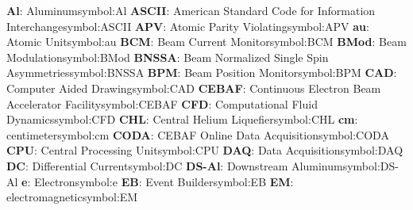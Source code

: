 \begin{tabbing}
\hspace{-0.27cm}
\addsymbol \textbf{Al}: {Aluminum}{symbol:Al}
\hspace{-0.27cm}
\addsymbol \textbf{ASCII}: {American Standard Code for Information Interchange}{symbol:ASCII}
\hspace{-0.27cm}
\addsymbol \textbf{APV}: {Atomic Parity Violating}{symbol:APV}
\hspace{-0.27cm}
\addsymbol \textbf{au}: {Atomic Unit}{symbol:au}
\hspace{-0.27cm}
\addsymbol \textbf{BCM}: {Beam Current Monitor}{symbol:BCM}
\hspace{-0.27cm}
\addsymbol \textbf{BMod}: {Beam Modulation}{symbol:BMod}
\hspace{-0.27cm}
\addsymbol \textbf{BNSSA}: {Beam Normalized Single Spin Asymmetries}{symbol:BNSSA}
\hspace{-0.27cm}
\addsymbol \textbf{BPM}: {Beam Position Monitor}{symbol:BPM}
\hspace{-0.27cm}
\addsymbol \textbf{CAD}: {Computer Aided Drawing}{symbol:CAD}
\hspace{-0.27cm}
\addsymbol \textbf{CEBAF}: {Continuous Electron Beam Accelerator Facility}{symbol:CEBAF}
\hspace{-0.27cm}
\addsymbol \textbf{CFD}: {Computational Fluid Dynamics}{symbol:CFD}
\hspace{-0.27cm}
\addsymbol \textbf{CHL}: {Central Helium Liquefier}{symbol:CHL}
\hspace{-0.27cm}
\addsymbol \textbf{cm}: {centimeter}{symbol:cm}
\hspace{-0.27cm}
\addsymbol \textbf{CODA}: {CEBAF Online Data Acquisition}{symbol:CODA}
\hspace{-0.27cm}
\addsymbol \textbf{CPU}: {Central Processing Unit}{symbol:CPU}
\hspace{-0.27cm}
\addsymbol \textbf{DAQ}: {Data Acquisition}{symbol:DAQ}
\hspace{-0.27cm}
\addsymbol \textbf{DC}: {Differential Current}{symbol:DC}
\hspace{-0.27cm}
\addsymbol \textbf{DS-Al}: {Downstream Aluminum}{symbol:DS-Al}
\hspace{-0.27cm}
\addsymbol \textbf{e}: {Electron}{symbol:e}
\hspace{-0.27cm}
\addsymbol \textbf{EB}: {Event Builder}{symbol:EB}
\hspace{-0.27cm}
\addsymbol \textbf{EM}: {electromagnetic}{symbol:EM}

\end{tabbing}
